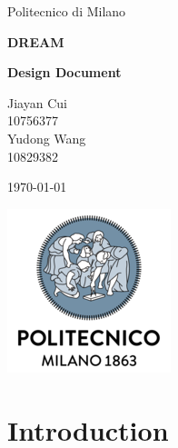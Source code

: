 \documentclass[10pt,english, openany]{book}
\begin{document}

\begin{titlepage}
	\clearpage\thispagestyle{empty}
	\centering
	\vspace{1cm}

	{\normalsize Politecnico di Milano\\\par}
		\vspace{2cm}
	{\Huge \textbf{DREAM}
	} \\
	{\large \textbf{Design Document} \par}
	\vspace{4cm}
	{\normalsize Jiayan Cui\\
	             10756377\\
	             Yudong Wang\\ 
                 10829382\\
                 \par}
	\vspace{5cm}
	
	{\normalsize \today \par}
	
	\vspace{0.5cm}
    
    \centering \includegraphics[scale=0.6]{logo1.png}
    
    
	\pagebreak

\end{titlepage}

\tableofcontents{}

\mainmatter

\chapter{Introduction}\label{chapt:sum}
\end{document}
